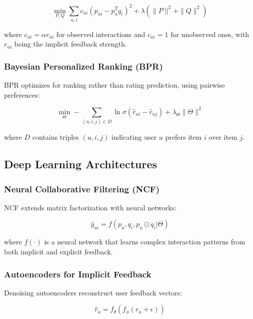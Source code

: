 \begin{equation}
\min_{P,Q} \sum_{u,i} c_{ui} (p_{ui} - p_u^T q_i)^2 + \lambda (\|P\|^2 + \|Q\|^2)
\label{eq:wmf}
\end{equation}

where $c_{ui} = \alpha r_{ui}$ for observed interactions and $c_{ui} = 1$ for unobserved ones, with $r_{ui}$ being the implicit feedback strength.

\subsubsection{Bayesian Personalized Ranking (BPR)}

BPR optimizes for ranking rather than rating prediction, using pairwise preferences:

\begin{equation}
\min_{\Theta} -\sum_{(u,i,j) \in D} \ln \sigma(\hat{r}_{ui} - \hat{r}_{uj}) + \lambda_\Theta \|\Theta\|^2
\label{eq:bpr}
\end{equation}

where $D$ contains triples $(u,i,j)$ indicating user $u$ prefers item $i$ over item $j$.

\subsection{Deep Learning Architectures}

\subsubsection{Neural Collaborative Filtering (NCF)}

NCF extends matrix factorization with neural networks:

\begin{equation}
\hat{y}_{ui} = f(p_u, q_i, p_u \odot q_i | \Theta)
\label{eq:ncf}
\end{equation}

where $f(\cdot)$ is a neural network that learns complex interaction patterns from both implicit and explicit feedback.

\subsubsection{Autoencoders for Implicit Feedback}

Denoising autoencoders reconstruct user feedback vectors:

\begin{equation}
\hat{r}_u = f_\theta(f_\phi(r_u + \epsilon))
\label{eq:autoencoder}
\end{equation}

